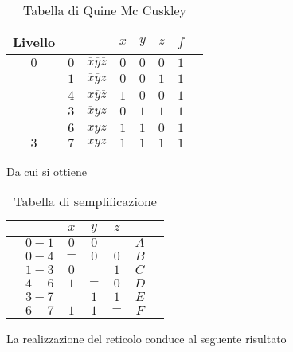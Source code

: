 \documentclass[a4paper]{extarticle}
\begin{document}
\begin{table}[H]
    \centering
    \setlength{\tabcolsep}{5pt}
    \begin{tabular}{c|c|c|ccc|cc}
         \textbf{Livello} & & & $x$ & $y$ & $z$ & $f$\\
         \hline
         $0$ & $0$ & $\overline{x}\overline{y}\overline{z}$ & $0$ & $0$ & $0$ & $1$\\
         \hline
         \parbox{3em}{} & $1$ & $\overline{x}\overline{y}z$ & $0$ & $0$ & $1$ & $1$\\
          & $4$ & $x\overline{y}\overline{z}$ & $1$ & $0$ & $0$ & $1$\\
         \hline
         \parbox{3em}{} &
         $3$ & $\overline{x}yz$ & $0$ & $1$ & $1$ & $1$\\
         & $6$ & $xy\overline{z}$ & $1$ & $1$ & $0$ & $1$\\
         \hline
         $3$ & $7$ & $xyz$ & $1$ & $1$ & $1$ & $1$\\
    \end{tabular}
    \caption{Tabella di Quine Mc Cuskley}
    \label{tab:tabella_quine_mc_cluskey}
\end{table}

\vspace{1em}
\noindent
Da cui si ottiene

\begin{table}[H]
    \centering
    \setlength{\tabcolsep}{5pt}
    \begin{tabular}{c|c|ccc|cc}
         & $ $ & $x$ & $y$ & $z$ & $ $ & \\
         \hline
         & $0 - 1$ & $0$ & $0$ & $-$ & $A$ & \\
         & $0 - 4$ & $-$ & $0$ & $0$ & $B$ & \\
         \hline
         & $1 - 3$ & $0$ & $-$ & $1$ & $C$ & \\
         & $4 - 6$ & $1$ & $-$ & $0$ & $D$ & \\
         \hline
         & $3 - 7$ & $-$ & $1$ & $1$ & $E$ & \\
         & $6 - 7$ & $1$ & $1$ & $-$ & $F$ & \\
    \end{tabular}
    \caption{Tabella di semplificazione}
    \label{tab:semplificazione_quine_mc_cuskey}
\end{table}

\vspace{1em}
\noindent
La realizzazione del reticolo conduce al seguente risultato
\end{document}
